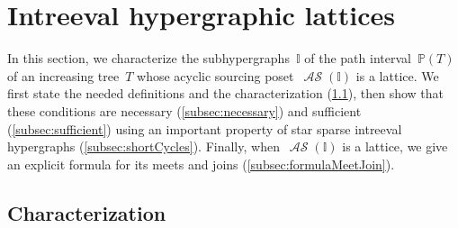 \documentclass{amsart}
\theoremstyle{definition}
\DeclareMathOperator{\ASour}{\mathcal{AS}}  %
\newcommand{\II}{\mathbb I} %
\newcommand{\PP}{\mathbb P} %
\begin{document}


\section{Intreeval hypergraphic lattices}
\label{sec:intreevalHypergraphicPosets}

In this section, we characterize the subhypergraphs~$\II$ of the path interval~$\PP(T)$ of an increasing tree~$T$ whose acyclic sourcing poset~$\ASour(\II)$ is a lattice.
We first state the needed definitions and the characterization (\cref{subsec:characterization}), then show that these conditions are necessary (\cref{subsec:necessary}) and sufficient (\cref{subsec:sufficient}) using an important property of star sparse intreeval hypergraphs (\cref{subsec:shortCycles}).
Finally, when~$\ASour(\II)$ is a lattice, we give an explicit formula for its meets and joins (\cref{subsec:formulaMeetJoin}).


\subsection{Characterization}
\label{subsec:characterization}
\end{document}
